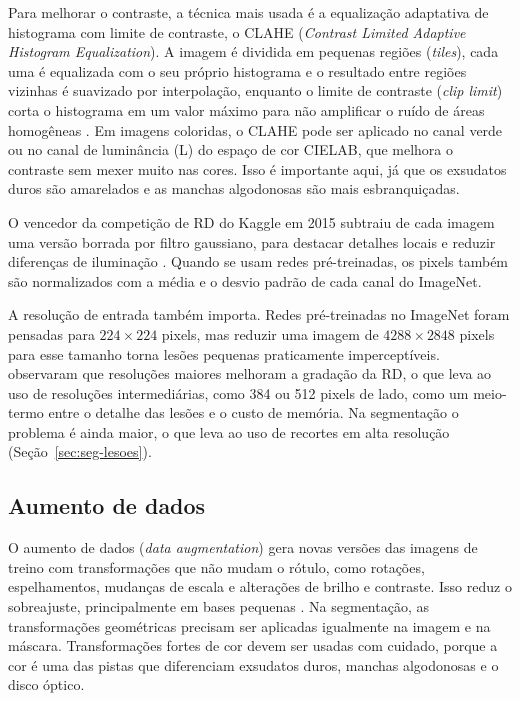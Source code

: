 Para melhorar o contraste, a técnica mais usada é a equalização adaptativa de histograma com limite de contraste, o CLAHE (\textit{Contrast Limited Adaptive Histogram Equalization}). A imagem é dividida em pequenas regiões (\textit{tiles}), cada uma é equalizada com o seu próprio histograma e o resultado entre regiões vizinhas é suavizado por interpolação, enquanto o limite de contraste (\textit{clip limit}) corta o histograma em um valor máximo para não amplificar o ruído de áreas homogêneas \cite{pizer1987ahe}. Em imagens coloridas, o CLAHE pode ser aplicado no canal verde ou no canal de luminância (L) do espaço de cor CIELAB, que melhora o contraste sem mexer muito nas cores. Isso é importante aqui, já que os exsudatos duros são amarelados e as manchas algodonosas são mais esbranquiçadas.

O vencedor da competição de RD do Kaggle em 2015 subtraiu de cada imagem uma versão borrada por filtro gaussiano, para destacar detalhes locais e reduzir diferenças de iluminação \cite{graham2015kaggle}. Quando se usam redes pré-treinadas, os pixels também são normalizados com a média e o desvio padrão de cada canal do ImageNet.

A resolução de entrada também importa. Redes pré-treinadas no ImageNet foram pensadas para $224 \times 224$ pixels, mas reduzir uma imagem de $4288 \times 2848$ pixels para esse tamanho torna lesões pequenas praticamente imperceptíveis.  observaram que resoluções maiores melhoram a gradação da RD, o que leva ao uso de resoluções intermediárias, como 384 ou 512 pixels de lado, como um meio-termo entre o detalhe das lesões e o custo de memória. Na segmentação o problema é ainda maior, o que leva ao uso de recortes em alta resolução (Seção~\ref{sec:seg-lesoes}).

\subsection{Aumento de dados}
\label{sec:aumento-dados}

O aumento de dados (\textit{data augmentation}) gera novas versões das imagens de treino com transformações que não mudam o rótulo, como rotações, espelhamentos, mudanças de escala e alterações de brilho e contraste. Isso reduz o sobreajuste, principalmente em bases pequenas \cite{shorten2019augmentation}. Na segmentação, as transformações geométricas precisam ser aplicadas igualmente na imagem e na máscara. Transformações fortes de cor devem ser usadas com cuidado, porque a cor é uma das pistas que diferenciam exsudatos duros, manchas algodonosas e o disco óptico.

